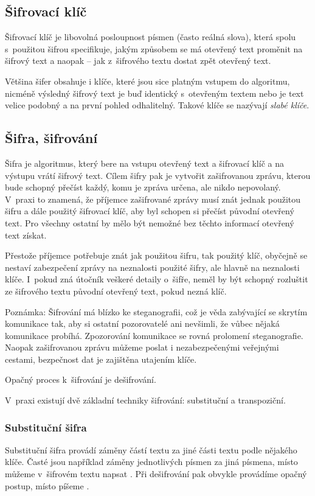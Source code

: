 \documentclass[12pt]{article}
\theoremstyle{definition}
\begin{document}
\subsection{Šifrovací klíč}
Šifrovací klíč je libovolná posloupnost písmen (často reálná slova), která spolu s~použitou šifrou specifikuje, jakým způsobem se má otevřený text proměnit na šifrový text a naopak -- jak z~šifrového textu dostat zpět otevřený text. 

Většina šifer obsahuje i klíče, které jsou sice platným vstupem do algoritmu, nicméně výsledný šifrový text je buď identický s~otevřeným textem nebo je text velice podobný a na první pohled odhalitelný. Takové klíče se nazývají {\em slabé klíče}. 

\subsection{Šifra, šifrování}
Šifra je algoritmus, který bere na vstupu otevřený text a šifrovací klíč a na výstupu vrátí šifrový text. Cílem šifry pak je vytvořit zašifrovanou zprávu, kterou bude schopný přečíst každý, komu je zpráva určena, ale nikdo nepovolaný. V~praxi to znamená, že příjemce zašifrované zprávy musí znát jednak použitou šifru a dále použitý šifrovací klíč, aby byl schopen si přečíst původní otevřený text. Pro všechny ostatní by mělo být nemožné bez těchto informací otevřený text získat. 

Přestože příjemce potřebuje znát jak použitou šifru, tak použitý klíč, obyčejně se nestaví zabezpečení zprávy na neznalosti použité šifry, ale hlavně na neznalosti klíče. I~pokud zná útočník veškeré detaily o~šifře, neměl by být schopný rozluštit ze šifrového textu původní otevřený text, pokud nezná klíč.

Poznámka: Šifrování má blízko ke steganografii, což je věda zabývající se skrytím komunikace tak, aby si ostatní pozorovatelé ani nevšimli, že vůbec nějaká komunikace probíhá. Zpozorování komunikace se rovná prolomení steganografie. Naopak zašifrovanou zprávu můžeme poslat i nezabezpečenými veřejnými cestami, bezpečnost dat je zajištěna utajením klíče. 

Opačný proces k~šifrování je dešifrování. 

V~praxi existují dvě základní techniky šifrování: substituční a transpoziční.

\subsubsection{Substituční šifra}
Substituční šifra provádí záměny částí textu za jiné části textu podle nějakého klíče. Časté jsou například záměny jednotlivých písmen za jiná písmena, místo  můžeme v~šifrovém textu napsat . Při dešifrování pak obvykle provádíme opačný postup, místo  píšeme . 
\end{document}
